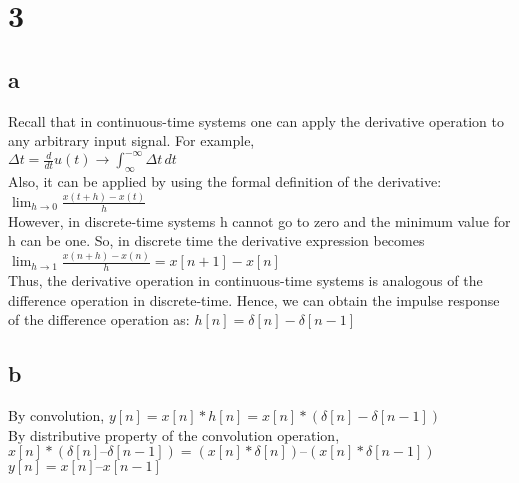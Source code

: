 \documentclass[12pt]{article}
\begin{document}
    \section*{3}
    \subsection*{a}
    Recall that in continuous-time systems one can apply the derivative
    operation to any arbitrary input signal. For example,\\
    \begin{math}
      \Delta t = \frac{d}{dt}u(t)\longrightarrow \int_{\infty }^{-\infty }  \Delta t\,dt 
    \end{math}\\
    Also, it can be applied by using the formal definition of the derivative:\\
    \begin{math}
      \lim_{h \to 0} \frac{x(t+h)-x(t)}{h} 
    \end{math}\\
    However, in discrete-time systems h cannot go to zero and the minimum
    value for h can be one. So, in discrete time the derivative expression becomes\\
    \begin{math}
      \lim_{h \to 1} \frac{x(n+h)-x(n)}{h} = x[n+1]-x[n] 
    \end{math}\\
    Thus, the derivative operation in continuous-time systems is analogous of
    the difference operation in discrete-time. Hence, we can obtain the impulse
    response of the difference operation as: \(h[n] = \delta[n] - \delta[n-1]\)
    \subsection*{b}
    By convolution, \(y[n] = x[n]*h[n] = x[n]*(\delta[n]-\delta[n-1])\)\\
    By distributive property of the convolution operation,\\ 
    \(x[n]*( \delta[n] – \delta[n-1]) = (x[n]* \delta[n]) – (x[n]* \delta[n-1])\)\\
    \(y[n] = x[n] – x[n-1]\)
\end{document}

